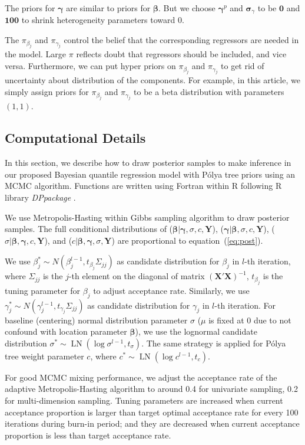 \documentclass[12pt]{article}
\newcommand{\polya}{P\'{o}lya}
\DeclareMathOperator{\LN}{LN}
\begin{document}
The priors for $\bm \gamma$ are similar to priors for $\bm \beta$. But
we choose $\bm \gamma^p$ and $\bm \sigma_{\gamma}$ to be $\bm 0$ and
$\bm{100}$ to shrink heterogeneity parameters toward 0.

The $\pi_{\beta_j}$ and $\pi_{\gamma_j}$ control the belief that the
corresponding regressors are needed in the model. Large $\pi$ reflects
doubt that regressors should be included, and vice versa. Furthermore,
we can put hyper priors on $\pi_{\beta_j}$ and $\pi_{\gamma_j}$ to get
rid of uncertainty about distribution of the components.  For example,
in this article, we simply assign priors for $\pi_{\beta_j}$ and
$\pi_{\gamma_j}$ to be a beta distribution with parameters $(1,1)$.

\subsection{Computational Details}\label{sec:computation}

In this section, we describe how to draw posterior samples to make
inference in our proposed Bayesian quantile regression model with
\polya{} tree priors using an MCMC algorithm. Functions are written
using Fortran within R \citep{R} following R library
\textit{DPpackage} \citep{DPpackage}.

We use Metropolis-Hasting within Gibbs sampling algorithm to draw
posterior samples. The full conditional distributions of ($\bm
\beta|\bm \gamma, \sigma, c, \bm Y$), ($\bm \gamma|\bm \beta, \sigma,
c, \bm Y$), ($\sigma|\bm \beta, \bm \gamma, c, \bm Y$), and ($c|\bm
\beta, \bm \gamma, \sigma, \bm Y$) are proportional to equation~(\ref{eq:post}).

We use $\beta_j^* \sim N(\beta_j^{l-1}, t_{\beta_j} \Sigma_{jj})$ as
candidate distribution for $\beta_j$ in $l$-th iteration, where
$\Sigma_{jj}$ is the $j$-th element on the diagonal of matrix
$\bm{(X'X)}^{-1}$, $t_{\beta_j}$ is the tuning parameter for $\beta_j$
to adjust acceptance rate.  Similarly, we use $\gamma_j^* \sim
N(\gamma_j^{l-1}, t_{\gamma_j}\Sigma_{jj})$ as candidate distribution
for $\gamma_j$ in $l$-th iteration.  For baseline (centering) normal
distribution parameter $\sigma$ ($\mu$ is fixed at 0 due to not
confound with location parameter $\bm \beta$), we use the lognormal
candidate distribution $\sigma^* \sim \LN(\log \sigma^{l-1},
t_{\sigma})$. The same strategy is applied for \polya{} tree weight
parameter $c$, where $c^* \sim \LN(\log c^{l-1}, t_c)$.

For good MCMC mixing performance, we adjust the acceptance rate of the
adaptive Metropolis-Hasting algorithm to around 0.4 for univariate
sampling, 0.2 for multi-dimension sampling. Tuning parameters are
increased when current acceptance proportion is larger than target
optimal acceptance rate for every 100 iterations during burn-in
period; and they are decreased when current acceptance proportion is
less than target acceptance rate.
\end{document}
